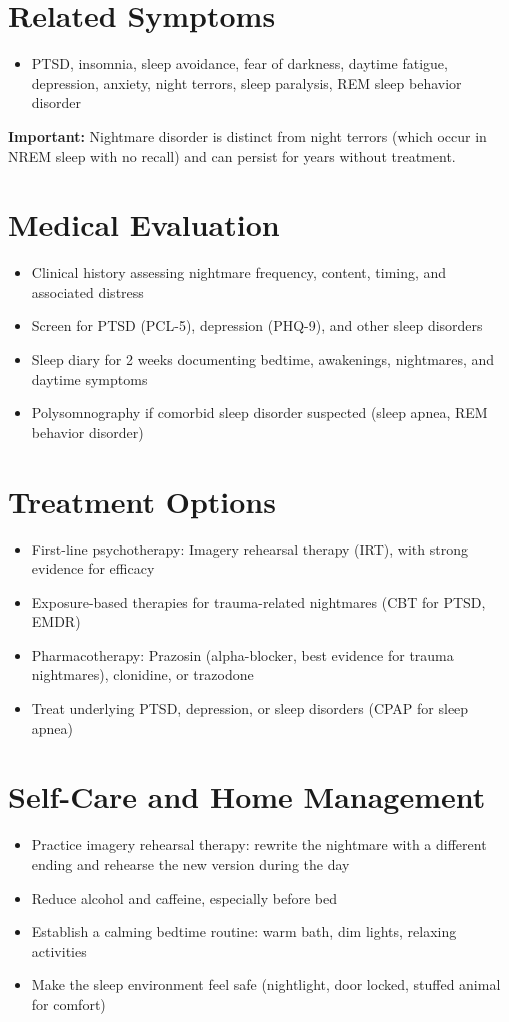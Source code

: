 \section*{Related Symptoms}
\begin{itemize}
  \item PTSD, insomnia, sleep avoidance, fear of darkness, daytime fatigue, depression, anxiety, night terrors, sleep paralysis, REM sleep behavior disorder
\end{itemize}
\textbf{Important:} Nightmare disorder is distinct from night terrors (which occur in NREM sleep with no recall) and can persist for years without treatment.

\section*{Medical Evaluation}
\begin{itemize}
  \item Clinical history assessing nightmare frequency, content, timing, and associated distress
  \item Screen for PTSD (PCL-5), depression (PHQ-9), and other sleep disorders
  \item Sleep diary for 2 weeks documenting bedtime, awakenings, nightmares, and daytime symptoms
  \item Polysomnography if comorbid sleep disorder suspected (sleep apnea, REM behavior disorder)
\end{itemize}

\section*{Treatment Options}
\begin{itemize}
  \item First-line psychotherapy: Imagery rehearsal therapy (IRT), with strong evidence for efficacy
  \item Exposure-based therapies for trauma-related nightmares (CBT for PTSD, EMDR)
  \item Pharmacotherapy: Prazosin (alpha-blocker, best evidence for trauma nightmares), clonidine, or trazodone
  \item Treat underlying PTSD, depression, or sleep disorders (CPAP for sleep apnea)
\end{itemize}

\section*{Self-Care and Home Management}
\begin{itemize}
  \item Practice imagery rehearsal therapy: rewrite the nightmare with a different ending and rehearse the new version during the day
  \item Reduce alcohol and caffeine, especially before bed
  \item Establish a calming bedtime routine: warm bath, dim lights, relaxing activities
  \item Make the sleep environment feel safe (nightlight, door locked, stuffed animal for comfort)
\end{itemize}

